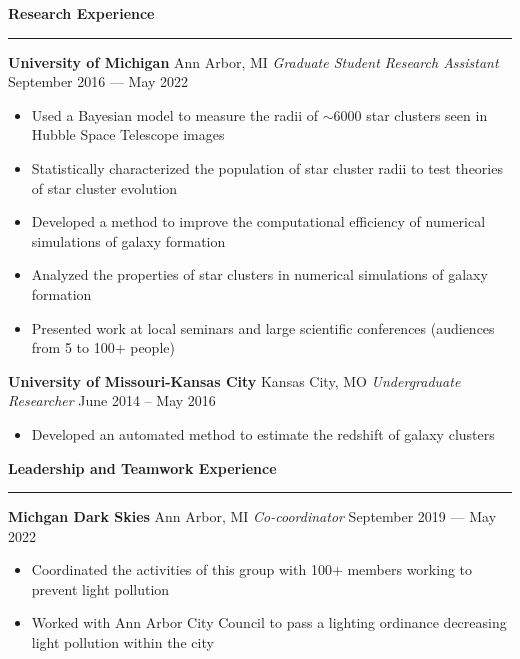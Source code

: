 \documentclass[10pt]{article}
\newcommand{\header}[1]{\vspace{1.0em}\par \textbf{\large #1}\strut\hrule\vspace{-0.9em}}
\newcommand{\actionHeader}[2]{\vspace{0.6em}\textbf{#1} \hfill #2}
\newcommand{\actionHeaderSecondLine}[2]{\newline \textit{#1} \hfill #2}
\begin{document}
\header{Research Experience}
\actionHeader{University of Michigan}{Ann Arbor, MI}
\actionHeaderSecondLine{Graduate Student Research Assistant}{September 2016 --- May 2022}
\begin{itemize}
    \item Used a Bayesian model to measure the radii of $\sim$6000 star clusters seen in Hubble Space Telescope images 
    \item Statistically characterized the population of star cluster radii to test theories of star cluster evolution
    \item Developed a method to improve the computational efficiency of numerical simulations of galaxy formation
    \item Analyzed the properties of star clusters in numerical simulations of galaxy formation
    \item Presented work at local seminars and large scientific conferences (audiences from 5 to 100+ people)
\end{itemize}

\actionHeader{University of Missouri-Kansas City}{Kansas City, MO}
\actionHeaderSecondLine{Undergraduate Researcher}{June 2014 -- May 2016} 
\begin{itemize}
    \item Developed an automated method to estimate the redshift of galaxy clusters
\end{itemize}

\header{Leadership and Teamwork Experience}
\actionHeader{Michgan Dark Skies}{Ann Arbor, MI}
\actionHeaderSecondLine{Co-coordinator}{September 2019 --- May 2022}
\begin{itemize}
    \item Coordinated the activities of this group with 100+ members working to prevent light pollution
    \item Worked with Ann Arbor City Council to pass a lighting ordinance decreasing light pollution within the city
\end{itemize}
\end{document}

